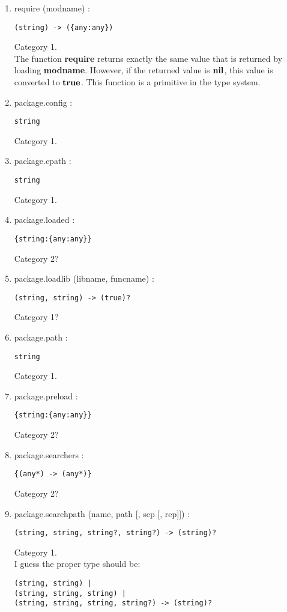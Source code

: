 \begin{enumerate}
\item require (modname) :
\begin{verbatim}
(string) -> ({any:any})
\end{verbatim}
Category 1.
\\
The function \textbf{require} returns exactly the same value that is
returned by loading \textbf{modname}.
However, if the returned value is $\mathbf{nil}$, this value is
converted to $\mathbf{true}$.
This function is a primitive in the type system.
\item package.config :
\begin{verbatim}
string
\end{verbatim}
Category 1.
\item package.cpath :
\begin{verbatim}
string
\end{verbatim}
Category 1.
\item package.loaded :
\begin{verbatim}
{string:{any:any}}
\end{verbatim}
Category 2?
\item package.loadlib (libname, funcname) :
\begin{verbatim}
(string, string) -> (true)?
\end{verbatim}
Category 1?
\item package.path :
\begin{verbatim}
string
\end{verbatim}
Category 1.
\item package.preload :
\begin{verbatim}
{string:{any:any}}
\end{verbatim}
Category 2?
\item package.searchers :
\begin{verbatim}
{(any*) -> (any*)}
\end{verbatim}
Category 2?
\item package.searchpath (name, path [, sep [, rep]]) :
\begin{verbatim}
(string, string, string?, string?) -> (string)?
\end{verbatim}
Category 1.
\\
I guess the proper type should be:
\begin{verbatim}
(string, string) |
(string, string, string) |
(string, string, string, string?) -> (string)?
\end{verbatim}
\end{enumerate}


